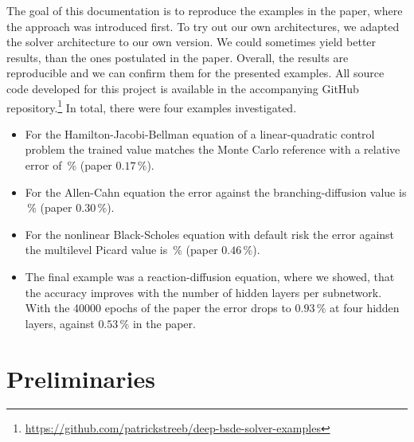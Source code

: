 ﻿\documentclass[10pt,a4paper]{article}
\begin{document}
\newline
The goal of this documentation is to reproduce the examples in the paper, where the approach was introduced first. To try out our own architectures, we adapted the solver architecture to our own version. We could sometimes yield better results, than the ones postulated in the paper. Overall, the results are reproducible and we can confirm them for the presented examples. All source code developed for this project is available in the accompanying GitHub repository.\footnote{\url{https://github.com/patrickstreeb/deep-bsde-solver-examples}} In total, there were four examples investigated.
\begin{itemize}
    \item [(1)] For the Hamilton-Jacobi-Bellman equation of
a linear-quadratic control problem the trained value matches the Monte
Carlo reference with a relative error of \hjbRelErr\,\% (paper
$0.17\,\%$).
\item [(2)] For the Allen-Cahn equation the error against the
branching-diffusion value is \acRelErr\,\% (paper $0.30\,\%$). 
\item [(3)] For the
nonlinear Black-Scholes equation with default risk the error against the
multilevel Picard value is \drRelErr\,\% (paper $0.46\,\%$). 
\item [(4)] The final example was a
reaction-diffusion equation, where we showed, that the accuracy improves with the number of hidden layers per subnetwork. With the 40000 epochs of the paper the error drops to $0.93\,\%$ at four hidden layers, against $0.53\,\%$ in the paper.
\end{itemize}



\section{Preliminaries}
\label{sec:preliminaries}
\end{document}
